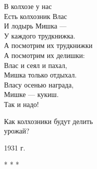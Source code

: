 \begin{center}
\begin{minipage}{0.4\textwidth}
\raggedright
В колхозе у нас \\
Есть колхозник Влас \\
И лодырь Мишка --- \\
У каждого трудкнижка. \\
А посмотрим их трудкнижки \\
А посмотрим их делишки: \\
Влас и сеял и пахал, \\
Мишка только отдыхал. \\
Власу осенью награда, \\
Мишке --- кукиш. \\
Так и надо!

\vspace{0.5cm}
Как колхозники будут делить \\
урожай?

\vspace{0.2cm}
\begin{flushright}
   1931 г. 
\end{flushright}
\end{minipage}
\end{center}

\begin{center}
* * *    
\end{center}
